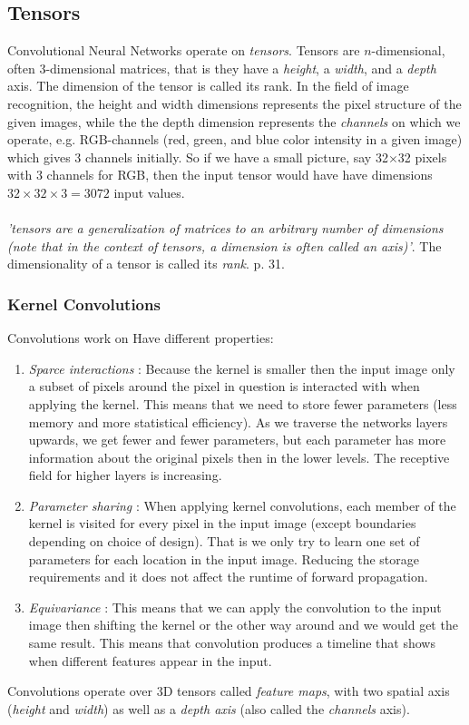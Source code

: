 \documentclass[a4paper,11pt]{article}
\begin{document}
\subsection{Tensors}
Convolutional Neural Networks operate on \textit{tensors}. Tensors are $n$-dimensional, often 3-dimensional matrices, that is they have a \textit{height}, a \textit{width}, and a \textit{depth} axis. The dimension of the tensor is called its rank. In the field of image recognition, the height and width dimensions represents the pixel structure of the given images, while the the depth dimension represents the \textit{channels} on which we operate, e.g. RGB-channels (red, green, and blue color intensity in a given image) which gives 3 channels initially. So if we have a small picture, say 32$\times$32 pixels with 3 channels for RGB, then the input tensor would have have dimensions $32\times32\times3=3072$ input values.\\ \\
\textit{'tensors are a generalization of matrices to an arbitrary number of dimensions
	(note that in the context of tensors, a dimension is often called an axis)'}. The dimensionality of a tensor is called its \textit{rank}. \cite{Chollet-et-al-2018} p. 31. 
\subsubsection{Kernel Convolutions}
Convolutions work on 
Have different properties:
\begin{enumerate}
	\item \textit{Sparce interactions} : Because the kernel is smaller then the input image only a subset of pixels around the pixel in question is interacted with when applying the kernel. This means that we need to store fewer parameters (less memory and more statistical efficiency). As we traverse the networks layers upwards, we get fewer and fewer parameters, but each parameter has more information about the original pixels then in the lower levels. The receptive field for higher layers is increasing.  
	\item \textit{Parameter sharing} : When applying kernel convolutions, each member of the kernel is visited for every pixel in the input image (except boundaries depending on choice of design). That is we only try to learn one set of parameters for each location in the input image. Reducing the storage requirements and it does not affect the runtime of forward propagation.
	\item \textit{Equivariance} : This means that we can apply the convolution to the input image then shifting the kernel or the other way around and we would get the same result. This means that convolution produces a timeline that shows when different features appear in the input.
\end{enumerate}\cite{Goodfellow-et-al-2016}
Convolutions operate over 3D tensors called \textit{feature maps}, with two spatial axis (\textit{height} and \textit{width}) as well as a \textit{depth axis} (also called the \textit{channels} axis).\cite{Chollet-et-al-2018}
\end{document}
